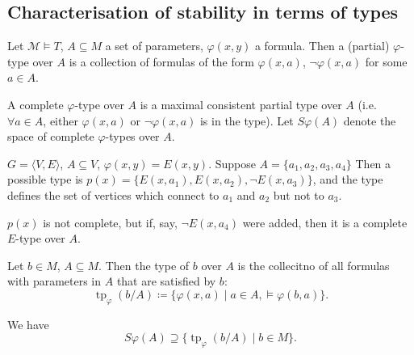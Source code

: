 \documentclass{article}
\let\models\vDash
\DeclareMathOperator{\tp}{tp}
\begin{document}
\subsection{Characterisation of stability in terms of types}
\begin{defi}
  Let $\mathscr{M} \models T$, $A \subseteq M$ a set of parameters, $\varphi(x,y)$ a formula.
  Then a (partial) $\varphi$-type over $A$ is a collection of formulas of the form $\varphi(x,a)$, $\neg \varphi(x,a)$ for some $a \in A$.
\end{defi}
\begin{defi}
  A complete $\varphi$-type over $A$ is a maximal consistent partial type over $A$ (i.e.\ $\forall a \in A$, either $\varphi(x,a)$ or $\neg \varphi(x,a)$ is in the type).
  Let $S \varphi(A)$ denote the space of complete $\varphi$-types over $A$.
\end{defi}
\begin{eg}
  $G = \langle V,E \rangle$, $A \subseteq V$, $\varphi(x,y) = E(x,y)$. Suppose $A = \{a_1,a_2,a_3,a_4\}$
  Then a possible type is $p(x) = \{E(x,a_1), E(x,a_2), \neg E(x,a_3)\}$, and the type defines the set of vertices which connect to $a_1$ and $a_2$ but not to $a_3$.
  \begin{center}
  \end{center}
  $p(x)$ is not complete, but if, say, $\neg E(x,a_4)$ were added, then it is a complete $E$-type over $A$.
\end{eg}
\begin{defi}
  Let $b \in M$, $A \subseteq M$. Then the type of $b$ over $A$ is the collecitno of all formulas with parameters in $A$ that are satisfied by $b$:
  \begin{equation*}
    \tp_\varphi(b/A) \coloneqq \{\varphi(x,a) \mid a \in A, \models \varphi(b,a)\}.
  \end{equation*}
\end{defi}
We have
\begin{equation*}
  S\varphi(A) \supseteq \{\tp_\varphi(b/A) \mid b \in M\}.
\end{equation*}
\end{document}
